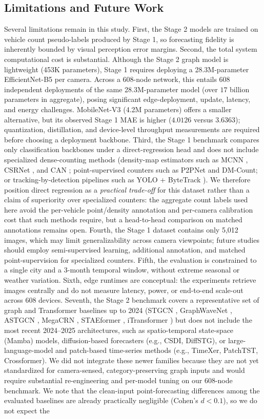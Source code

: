 \documentclass[journal,twocolumn]{IEEEtran}
\begin{document}
\subsection{Limitations and Future Work}
Several limitations remain in this study. First, the Stage 2 models are trained on vehicle count pseudo-labels produced by Stage 1, so forecasting fidelity is inherently bounded by visual perception error margins. Second, the total system computational cost is substantial. Although the Stage 2 graph model is lightweight (453K parameters), Stage 1 requires deploying a 28.3M-parameter EfficientNet-B5 per camera. Across a 608-node network, this entails 608 independent deployments of the same 28.3M-parameter model (over $17$ billion parameters in aggregate), posing significant edge-deployment, update, latency, and energy challenges. MobileNet-V3 (4.2M parameters) offers a smaller alternative, but its observed Stage 1 MAE is higher ($4.0126$ versus $3.6363$); quantization, distillation, and device-level throughput measurements are required before choosing a deployment backbone. Third, the Stage 1 benchmark compares only classification backbones under a direct-regression head and does not include specialized dense-counting methods (density-map estimators such as MCNN \cite{mcnn}, CSRNet \cite{csrnet}, and CAN \cite{can}; point-supervised counters such as P2PNet and DM-Count; or tracking-by-detection pipelines such as YOLO + ByteTrack \cite{yolo}). We therefore position direct regression as a \emph{practical trade-off} for this dataset rather than a claim of superiority over specialized counters: the aggregate count labels used here avoid the per-vehicle point/density annotation and per-camera calibration cost that such methods require, but a head-to-head comparison on matched annotations remains open. Fourth, the Stage 1 dataset contains only 5,012 images, which may limit generalizability across camera viewpoints; future studies should employ semi-supervised learning, additional annotation, and matched point-supervision for specialized counters. Fifth, the evaluation is constrained to a single city and a 3-month temporal window, without extreme seasonal or weather variation. Sixth, edge runtimes are conceptual: the experiments retrieve images centrally and do not measure latency, power, or end-to-end scale-out across 608 devices. Seventh, the Stage 2 benchmark covers a representative set of graph and Transformer baselines up to 2024 (STGCN \cite{stgcn}, GraphWaveNet \cite{wavenet}, ASTGCN \cite{astgcn}, MegaCRN \cite{megacrn}, STAEformer \cite{staeformer}, iTransformer \cite{itransformer}) but does not include the most recent 2024--2025 architectures, such as spatio-temporal state-space (Mamba) models, diffusion-based forecasters (e.g., CSDI, DiffSTG), or large-language-model and patch-based time-series methods (e.g., TimeXer, PatchTST, Crossformer). We did not integrate these newer families because they are not yet standardized for camera-sensed, category-preserving graph inputs and would require substantial re-engineering and per-model tuning on our 608-node benchmark. We note that the clean-input point-forecasting differences among the evaluated baselines are already practically negligible (Cohen's $d < 0.1$), so we do not expect the 
\end{document}
